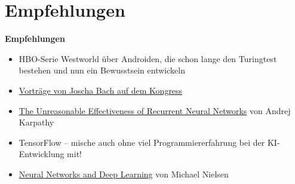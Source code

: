 \documentclass[12pt,compress,ngerman,utf8,t]{beamer}
\renewcommand{\_}{\mathpunct{.}\,}
\newcommand{\hil}[1]{{\usebeamercolor[fg]{item}{\textbf{#1}}}}
\begin{document}
\section{Empfehlungen}

{
\begin{frame}
  \centering
  \bigskip\bigskip

  \Huge \hil{Teil V}

  \bigskip
  \Large\textbf{Empfehlungen}
  \par

  \vfill\small
  \begin{itemize}
    \item HBO-Serie Westworld über Androiden, die schon lange den Turingtest
    bestehen und nun ein Bewusstsein entwickeln
    \item \href{https://www.youtube.com/watch?v=lKQ0yaEJjok}{Vorträge von
    Joscha Bach auf dem Kongress}
    \item \href{https://karpathy.github.io/2015/05/21/rnn-effectiveness/}{The
    Unreasonable Effectiveness of Recurrent Neural Networks} von Andrej
    Karpathy
    \item TensorFlow -- mische auch ohne viel Programmiererfahrung bei der
    KI-Entwicklung mit!
    \item \href{http://neuralnetworksanddeeplearning.com/}{Neural Networks and Deep Learning} von Michael Nielsen
  \end{itemize}
\end{frame}}
\end{document}
